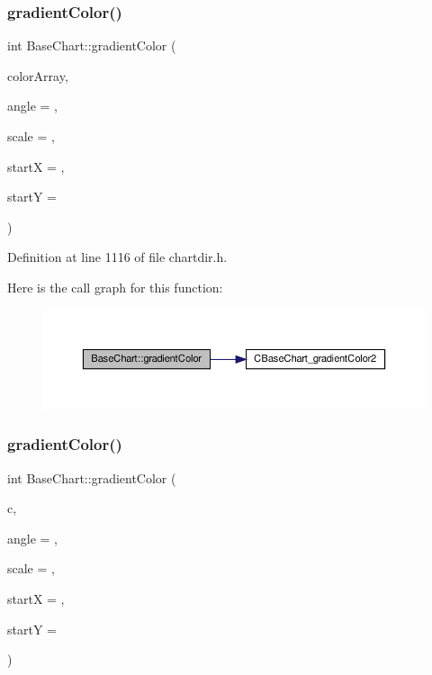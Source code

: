 \subsubsection{\texorpdfstring{gradient\+Color()}{gradientColor()}\hspace{0.1cm}{\footnotesize\ttfamily [2/3]}}
{\footnotesize\ttfamily int Base\+Chart\+::gradient\+Color (\begin{DoxyParamCaption}\item[{\hyperlink{class_int_array}{Int\+Array}}]{color\+Array,  }\item[{double}]{angle = {},  }\item[{double}]{scale = {},  }\item[{int}]{startX = {},  }\item[{int}]{startY = {} }\end{DoxyParamCaption})\hspace{0.3cm}{\ttfamily [inline]}}



Definition at line 1116 of file chartdir.\+h.

Here is the call graph for this function\+:
\nopagebreak
\begin{figure}[H]
\begin{center}
\leavevmode
\includegraphics[width=350pt]{class_base_chart_a645f49a14197731a2e96e02c8df1f468_cgraph}
\end{center}
\end{figure}
\mbox{\label{class_base_chart_afccfb0b504a015434d0e8504d683f0b5}} 
\subsubsection{\texorpdfstring{gradient\+Color()}{gradientColor()}\hspace{0.1cm}{\footnotesize\ttfamily [3/3]}}
{\footnotesize\ttfamily int Base\+Chart\+::gradient\+Color (\begin{DoxyParamCaption}\item[{const int $\ast$}]{c,  }\item[{double}]{angle = {},  }\item[{double}]{scale = {},  }\item[{int}]{startX = {},  }\item[{int}]{startY = {} }\end{DoxyParamCaption})\hspace{0.3cm}{\ttfamily [inline]}}



